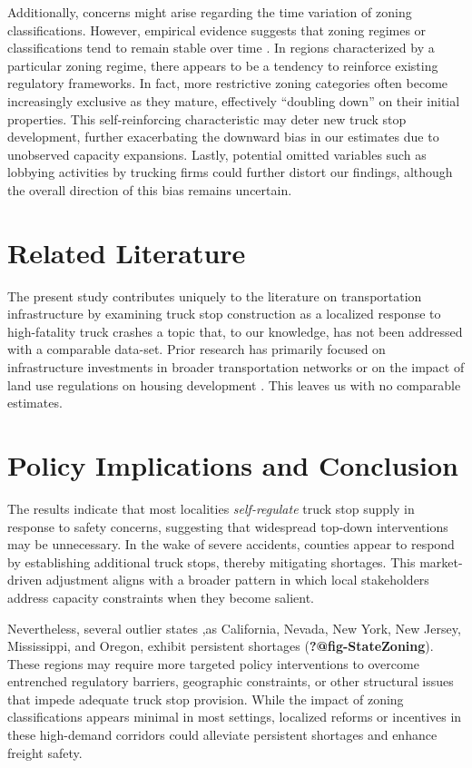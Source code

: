 \documentclass[
  8pt,
  12pt]{article}
\begin{document}
Additionally, concerns might arise regarding the time variation of
zoning classifications. However, empirical evidence suggests that zoning
regimes or classifications tend to remain stable over time
\citep{mclaughlinLandUseRegulation2012}. In regions characterized by a
particular zoning regime, there appears to be a tendency to reinforce
existing regulatory frameworks. In fact, more restrictive zoning
categories often become increasingly exclusive as they mature,
effectively ``doubling down'' on their initial properties. This
self-reinforcing characteristic may deter new truck stop development,
further exacerbating the downward bias in our estimates due to
unobserved capacity expansions. Lastly, potential omitted variables such
as lobbying activities by trucking firms could further distort our
findings, although the overall direction of this bias remains uncertain.

\section{Related Literature}\label{related-literature}

The present study contributes uniquely to the literature on
transportation infrastructure by examining truck stop construction as a
localized response to high-fatality truck crashes a topic that, to our
knowledge, has not been addressed with a comparable data-set. Prior
research has primarily focused on infrastructure investments in broader
transportation networks or on the impact of land use regulations on
housing development \citet{mclaughlinLandUseRegulation2012} . This
leaves us with no comparable estimates.

\section{\texorpdfstring{\textbf{Policy Implications and
Conclusion}}{Policy Implications and Conclusion}}\label{policy-implications-and-conclusion}

The results indicate that most localities \emph{self-regulate} truck
stop supply in response to safety concerns, suggesting that widespread
top-down interventions may be unnecessary. In the wake of severe
accidents, counties appear to respond by establishing additional truck
stops, thereby mitigating shortages. This market-driven adjustment
aligns with a broader pattern in which local stakeholders address
capacity constraints when they become salient.

Nevertheless, several outlier states ,as California, Nevada, New York,
New Jersey, Mississippi, and Oregon, exhibit persistent shortages
(\textbf{?@fig-StateZoning}). These regions may require more targeted
policy interventions to overcome entrenched regulatory barriers,
geographic constraints, or other structural issues that impede adequate
truck stop provision. While the impact of zoning classifications appears
minimal in most settings, localized reforms or incentives in these
high-demand corridors could alleviate persistent shortages and enhance
freight safety.
\end{document}
